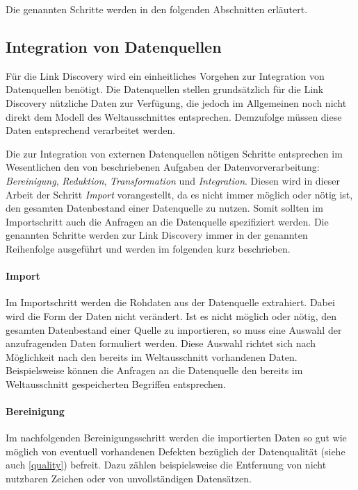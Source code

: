 Die genannten Schritte werden in den folgenden Abschnitten erläutert.

\subsection{Integration von Datenquellen}
\label{integration_generic}

Für die Link Discovery wird ein einheitliches Vorgehen zur Integration von Datenquellen benötigt. Die Datenquellen stellen grundsätzlich für die Link Discovery nützliche Daten zur Verfügung, die jedoch im Allgemeinen noch nicht direkt dem Modell des Weltausschnittes entsprechen. Demzufolge müssen diese Daten entsprechend verarbeitet werden.

Die zur Integration von externen Datenquellen nötigen Schritte entsprechen im Wesentlichen den von \textcite[S. 48f.]{hkp2012} beschriebenen Aufgaben der Datenvorverarbeitung: \emph{Bereinigung}, \emph{Reduktion}, \emph{Transformation} und \emph{Integration}. Diesen wird in dieser Arbeit der Schritt \emph{Import} vorangestellt, da es nicht immer möglich oder nötig ist, den gesamten Datenbestand einer Datenquelle zu nutzen. Somit sollten im Importschritt auch die Anfragen an die Datenquelle spezifiziert werden. Die genannten Schritte werden zur Link Discovery immer in der genannten Reihenfolge ausgeführt und werden im folgenden kurz beschrieben.

\paragraph{Import}

Im Importschritt werden die Rohdaten aus der Datenquelle extrahiert. Dabei wird die Form der Daten nicht verändert. Ist es nicht möglich oder nötig, den gesamten Datenbestand einer Quelle zu importieren, so muss eine Auswahl der anzufragenden Daten formuliert werden. Diese Auswahl richtet sich nach Möglichkeit nach den bereits im Weltausschnitt vorhandenen Daten. Beispielsweise können die Anfragen an die Datenquelle den bereits im Weltausschnitt gespeicherten Begriffen entsprechen.

\paragraph{Bereinigung}

Im nachfolgenden Bereinigungsschritt werden die importierten Daten so gut wie möglich von eventuell vorhandenen Defekten bezüglich der Datenqualität (siehe auch \cref{quality}) befreit. Dazu zählen beispielsweise die Entfernung von nicht nutzbaren Zeichen oder von unvollständigen Datensätzen.

